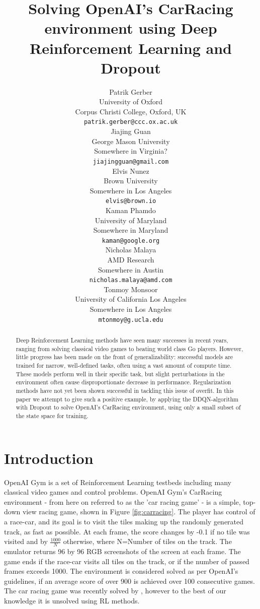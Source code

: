 \documentclass{article}
\title{Solving OpenAI's CarRacing environment using Deep Reinforcement Learning and Dropout}
\author{
  Patrik Gerber \\
  University of Oxford \\
  Corpus Christi College, Oxford, UK \\
  \texttt{patrik.gerber@ccc.ox.ac.uk} \\
  \And
  Jiajing Guan \\
  George Mason University \\ 
  Somewhere in Virginia? \\
  \texttt{jiajingguan@gmail.com} \\
  \And
  Elvis Nunez \\
  Brown University \\
  Somewhere in Los Angeles \\
  \texttt{elvis@brown.io} \\
  \And
  Kaman Phamdo \\
  University of Maryland \\
  Somewhere in Maryland \\
  \texttt{kaman@google.org} \\
  \And
  Nicholas Malaya \\
  AMD Research \\ 
  Somewhere in Austin \\
  \texttt{nicholas.malaya@amd.com} \\
  \And
  Tonmoy Monsoor \\
  University of California Los Angeles \\
  Somewhere in Los Angeles \\
  \texttt{mtonmoy@g.ucla.edu} \\
}
\begin{document}

\maketitle

\begin{abstract}
Deep Reinforcement Learning methods have seen many successes in recent years, ranging from solving classical video games to beating 
world class Go players. However, little progress has been made on the front of generalizability: successful models are trained for 
narrow, well-defined tasks, often using a vast amount of compute time. These models perform well in their specific task, but slight 
perturbations in the environment often cause disproportionate decrease in performance. Regularization methods have not yet been shown 
successful in tackling this issue of overfit. In this paper we attempt to give such a positive example, by applying the DDQN-algorithm 
with Dropout to solve OpenAI's CarRacing environment, using only a small subset of the state space for training. 
\end{abstract}

\section{Introduction}

OpenAI Gym is a set of Reinforcement Learning testbeds including many classical video games and control problems. OpenAI Gym's 
CarRacing environment - from here on referred to as the 'car racing game' - is a simple, top-down view racing game, shown in 
Figure \ref{fig:carracing}. The player has control of a race-car, and its goal is to visit the tiles making up the randomly 
generated track, as fast as possible. At each frame, the score changes by -0.1 if no tile was visited and by 
$\frac{1000}{N}$ otherwise, where N=Number of tiles on the track. The emulator returns 96 by 96 RGB screenshots 
of the screen at each frame. The game ends if the race-car visits all tiles on the track, or if the number of passed frames exceeds 1000. The environment is considered solved as per OpenAI's guidelines, if an average score of over 900 is achieved over 100 consecutive 
games. The car racing game was recently solved by \cite{World_Models}, however to the best of our knowledge it is unsolved 
using RL methods. 
\par
\end{document}
